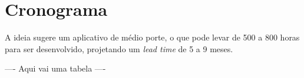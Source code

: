 \chapter[Cronograma]{Cronograma}


A ideia sugere um aplicativo de médio porte, o que pode levar de 500 a 800 horas para ser desenvolvido, projetando um \textit{lead time} de 5 a 9 meses.

---- Aqui vai uma tabela ----
%
%
%
%
